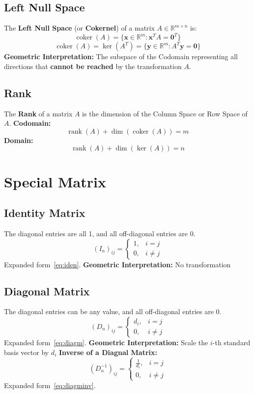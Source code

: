 \documentclass{article}
\begin{document}
\subsection{Left Null Space}
The \textbf{Left Null Space} (or \textbf{Cokernel}) of a matrix $A \in \mathbb{R}^{m \times n}$ is:
\[
    \operatorname{coker}(A) = \{ \mathbf{x} \in \mathbb{R}^m : \mathbf{x}^T A = \mathbf{0}^T \}
\]
\[
    \operatorname{coker}(A) = \ker(A^T) = \{ \mathbf{y} \in \mathbb{R}^m : A^T \mathbf{y} = \mathbf{0} \}
\]
\textbf{Geometric Interpretation:} The subspace of the Codomain representing all directions that \textbf{cannot be reached} by the transformation $A$.

\subsection{Rank}
The \textbf{Rank} of a matrix $A$ is the dimension of the Column Space or Row Space of $A$.
\newline
\textbf{Codomain:}
\[
    \operatorname{rank}(A) + \dim(\operatorname{coker}(A)) = m
\]
\textbf{Domain:}
\[
    \operatorname{rank}(A) + \dim(\ker(A)) = n
\]


\newpage
\section{Special Matrix}

\subsection{Identity Matrix}
The diagonal entries are all 1, and all off-diagonal entries are 0.
\[
    (I_n)_{ij} =
    \begin{cases}
        1, & i = j \\
        0, & i \neq j
    \end{cases}
\]
Expanded form~\ref{eq:iden}.
\newline
\textbf{Geometric Interpretation:} No transformation

\subsection{Diagonal Matrix}
The diagonal entries can be any value, and all off-diagonal entries are 0.
\[
    (D_n)_{ij} =
    \begin{cases}
        d_i, & i = j \\
        0, & i \neq j
    \end{cases}
\]
Expanded form~\ref{eq:diagm}.
\newline
\textbf{Geometric Interpretation:} Scale the $i$-th standard basis vector by $d_i$
\newline
\textbf{Inverse of a Diagnal Matrix:}
\[
    (D_n^{-1})_{ij} =
    \begin{cases}
        \frac{1}{d_i}, & i = j \\
        0, & i \neq j
    \end{cases}
\]
Expanded form~\ref{eq:diagminv}.
\end{document}
